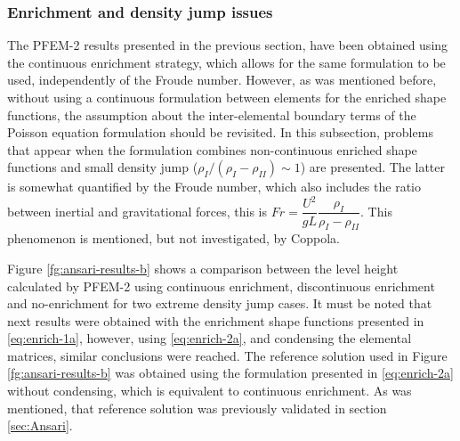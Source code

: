 \subsubsection{Enrichment and density jump issues}

The PFEM-2 results presented in the previous section, have been obtained using the continuous enrichment strategy, which allows for the same formulation to be used, independently of the Froude number. However, as was mentioned before, without using a continuous formulation between elements for the enriched shape functions, the assumption about the inter-elemental boundary terms of the Poisson equation formulation should be revisited. In this subsection, problems that appear when the formulation combines non-continuous enriched shape functions and small density jump ($\rho_I/(\rho_I-\rho_{II})\sim 1$) are presented. The latter is somewhat quantified by the Froude number, which also includes the ratio between inertial and gravitational forces, this is $Fr = \dfrac{U^2}{gL}\dfrac{\rho_I}{\rho_I-\rho_{II}}$. This phenomenon is mentioned, but not investigated, by Coppola\cite{Coppola05}.

Figure \ref{fg:ansari-results-b} shows a comparison between the level height calculated by PFEM-2 using continuous enrichment, discontinuous enrichment and no-enrichment for two extreme density jump cases. It must be noted that next results were obtained with the enrichment shape functions presented in \ref{eq:enrich-1a}, however, using \ref{eq:enrich-2a}, and condensing the elemental matrices, similar conclusions were reached. The reference solution used in Figure \ref{fg:ansari-results-b} was obtained using the formulation presented in \ref{eq:enrich-2a} without condensing, which is equivalent to continuous enrichment. As was mentioned, that reference solution was previously validated in section \ref{sec:Ansari}.


